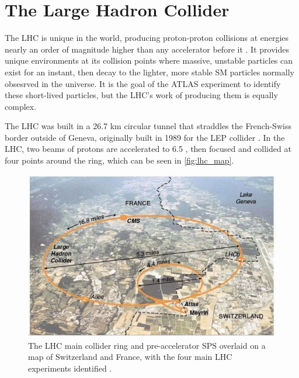 
\chapter{The Large Hadron Collider} %

\label{ch:lhc} %


The \acf{LHC} is unique in the world, producing proton-proton collisions at energies nearly an order of magnitude higher than any accelerator before it \cite{1748-0221-3-08-S08001}. It provides unique environments at its collision points where massive, unstable particles can exist for an instant, then decay to the lighter, more stable \ac{SM} particles normally obsesrved in the universe. It is the goal of the \ac{ATLAS} experiment to identify these short-lived particles, but the \ac{LHC}'s work of producing them is equally complex. 

The \ac{LHC} was built in a 26.7 km circular tunnel that straddles the French-Swiss border outside of Geneva, originally built in 1989 for the \ac{LEP} collider \cite{lep_tdr}. In the \ac{LHC}, two beams of protons are accelerated to 6.5 \tev, then focused and collided at four points around the ring, which can be seen in \autoref{fig:lhc_map}. 

\begin{centering}
\begin{figure}[!hbt]
\myfloatalign
\includegraphics[width=.90\linewidth]{figures/lhc/lhc-5-640x420.jpg}
\caption{The \ac{LHC} main collider ring and pre-accelerator \ac{SPS} overlaid on a map of Switzerland and France, with the four main \ac{LHC} experiments identified \cite{extremetech}.}
\label{fig:lhc_map}
\end{figure}
\end{centering}

